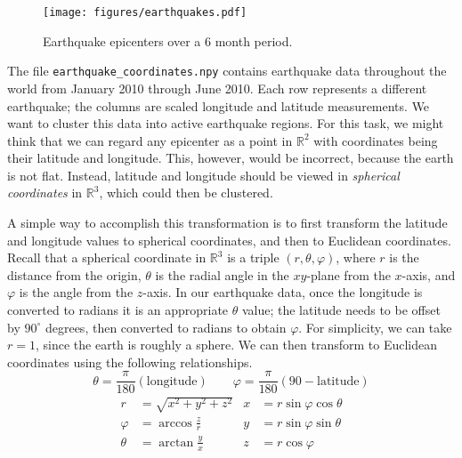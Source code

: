 \begin{figure}[H]
    \centering
    \texttt{[image: figures/earthquakes.pdf]}
    \caption{Earthquake epicenters over a 6 month period.}
    \label{fig:earthquakes}
\end{figure}

The file \texttt{earthquake\_coordinates.npy} contains earthquake data throughout the world from January 2010 through June 2010.
Each row represents a different earthquake; the columns are scaled longitude and latitude measurements.
We want to cluster this data into active earthquake regions.
For this task, we might think that we can regard any epicenter as a point in $\mathbb{R}^{2}$ with coordinates being their latitude and longitude.
This, however, would be incorrect, because the earth is not flat.
Instead, latitude and longitude should be viewed in \emph{spherical coordinates} in $\mathbb{R}^{3}$, which could then be clustered.

A simple way to accomplish this transformation is to first transform the latitude and longitude values to spherical coordinates, and then to Euclidean coordinates.
Recall that a spherical coordinate in $\mathbb{R}^3$ is a triple $(r,\theta,\varphi)$, where $r$ is the distance from the origin, $\theta$ is the radial angle in the $xy$-plane from the $x$-axis, and $\varphi$ is the angle from the $z$-axis.
In our earthquake data, once the longitude is converted to radians it is an appropriate $\theta$ value; the latitude needs to be offset by $90^\circ$ degrees, then converted to radians to obtain $\varphi$.
For simplicity, we can take $r=1$, since the earth is roughly a sphere.
We can then transform to Euclidean coordinates using the following relationships.
\[
\theta = \frac{\pi}{180}\left(\text{longitude}\right)
\qquad
\varphi = \frac{\pi}{180}\left(90 - \text{latitude}\right)
\]
\begin{align*}
r & = \sqrt{x^{2} + y^{2} + z^{2}} & x & = r \sin \varphi \cos \theta \\
\varphi & = \arccos \frac{z}{r} & y & = r \sin \varphi \sin \theta \\
\theta & = \arctan \frac{y}{x} & z & = r \cos \varphi
\end{align*}

